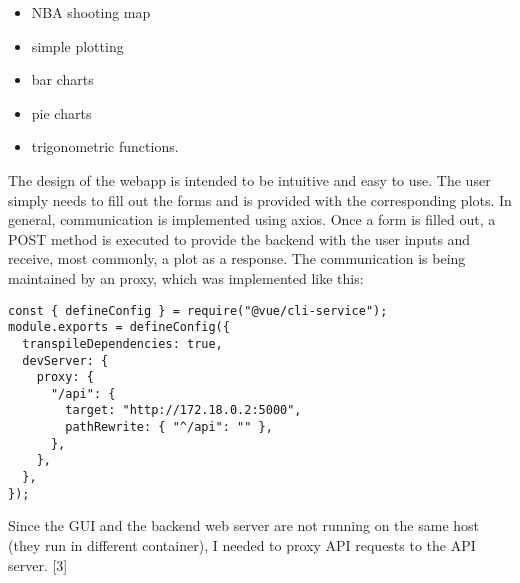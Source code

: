 \documentclass[sn-mathphys-num]{sn-jnl}%
\theoremstyle{thmstyleone}%
\theoremstyle{thmstyletwo}%
\theoremstyle{thmstylethree}%
\begin{document}
\bigskip
\begin{itemize}
    \item NBA shooting map
    \item simple plotting
    \item bar charts
    \item pie charts
    \item trigonometric functions.
\end{itemize}
\bigskip

The design of the webapp is intended to be intuitive and easy to use. The user simply needs to fill out the forms and is provided with the corresponding plots. In general, communication is implemented using axios. Once a form is filled out, a POST method is executed to provide the backend with the user inputs and receive, most commonly, a plot as a response. The communication is being maintained by an proxy, which was implemented like this:
\bigskip
\begin{verbatim}
const { defineConfig } = require("@vue/cli-service");
module.exports = defineConfig({
  transpileDependencies: true,
  devServer: {
    proxy: {
      "/api": {
        target: "http://172.18.0.2:5000",
        pathRewrite: { "^/api": "" },
      },
    },
  },
});
\end{verbatim}

Since the GUI and the backend web server are not running on the same host (they run in different container), I needed to proxy API requests to the API server. [3]
\end{document}

